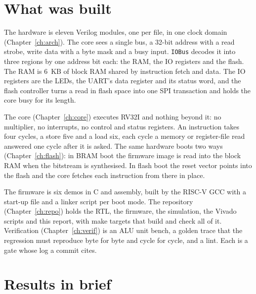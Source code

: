 \documentclass[11pt,a4paper]{report}
\begin{document}
\section{What was built}

The hardware is eleven Verilog modules, one per file, in one clock domain
(Chapter~\ref{ch:arch}). The core sees a single bus, a 32-bit address with a read strobe,
write data with a byte mask and a busy input. \texttt{IOBus} decodes it into three regions by
one address bit each: the RAM, the IO registers and the flash. The RAM is 6~KB of block RAM
shared by instruction fetch and data. The IO registers are the LEDs, the UART's data register
and its status word, and the flash controller turns a read in flash space into one SPI transaction
and holds the core busy for its length.

The core (Chapter~\ref{ch:core}) executes RV32I and nothing beyond it: no multiplier, no
interrupts, no control and status registers. An instruction takes four cycles, a store five
and a load six, each cycle a memory or register-file read answered one cycle after it is
asked. The same hardware boots two ways (Chapter~\ref{ch:flash}): in BRAM boot the firmware
image is read into the block RAM when the bitstream is synthesised. In flash boot the reset
vector points into the flash and the core fetches each instruction from there in place.

The firmware is six demos in C and assembly, built by the RISC-V GCC
with a start-up file and a linker script per boot mode. The repository
(Chapter~\ref{ch:repo}) holds the RTL, the firmware, the simulation, the Vivado scripts and
this report, with make targets that build and check all of it. Verification
(Chapter~\ref{ch:verif}) is an ALU unit bench, a golden trace that the regression must
reproduce byte for byte and cycle for cycle, and a lint. Each is a gate whose log a commit
cites.

\section{Results in brief}
\label{sec:results-brief}
\end{document}
